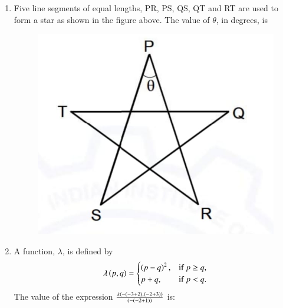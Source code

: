 \documentclass[journal,12pt,onecolumn]{article}
\theoremstyle{remark}
\begin{document}
\begin{enumerate}
\item Five line segments of equal lengths, PR, PS, QS, QT and RT are used to form a star as shown in the figure above.
The value of $\theta$, in degrees, is \underline{\hspace{2cm}}
\begin{figure}[H]
    \centering
    \includegraphics[width=0.7\columnwidth]{figs/1q8.jpg}
    \caption{}
    \label{fig:q8}
\end{figure}
\hfill{}
\begin{enumerate}
\end{enumerate}

\item A function, $\lambda$, is defined by
\begin{align}
\lambda\left(p,q\right) = 
\begin{cases}
    \left(p-q\right)^2, & \text{if } p \geq q, \\
    p+q, & \text{if } p < q.
\end{cases}
\end{align}
The value of the expression $\frac{\lambda\left(-\left(-3+2\right), \left(-2+3\right)\right)}{\left(-\left(-2+1\right)\right)}$ is:

\hfill{}
\begin{enumerate}
\end{enumerate}


\end{enumerate}
\end{document}
